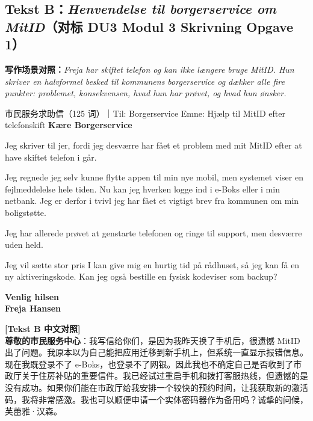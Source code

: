 \subsection*{Tekst B：\textit{Henvendelse til borgerservice om MitID}（对标 DU3 Modul 3 Skrivning Opgave 1）}

\textbf{写作场景对照：}\textit{Freja har skiftet telefon og kan ikke længere bruge MitID. Hun skriver en halvformel besked til kommunens borgerservice og dækker alle fire punkter: problemet, konsekvensen, hvad hun har prøvet, og hvad hun ønsker.}

\vspace{0.3em}
\begin{emailbox}{市民服务求助信（125 词）｜Til: Borgerservice \quad Emne: Hjælp til MitID efter telefonskift}
\textbf{Kære Borgerservice}

Jeg skriver til jer, fordi jeg desværre har fået et problem med mit MitID efter at have skiftet telefon i går.

Jeg regnede  jeg selv kunne flytte appen til min nye mobil, men systemet viser en fejlmeddelelse hele tiden. Nu kan jeg hverken logge ind i e-Boks eller i min netbank. Jeg er derfor i tvivl  jeg har fået et vigtigt brev fra kommunen om min boligstøtte.

Jeg har allerede prøvet at genstarte telefonen og ringe til support, men desværre uden held.

Jeg vil sætte stor pris  I kan give mig en hurtig tid på rådhuset, så jeg kan få en ny aktiveringskode. Kan jeg også bestille en fysisk kodeviser som backup?

\textbf{Venlig hilsen}\\
\textbf{Freja Hansen}
\end{emailbox}

\begin{transbox}
\small
\textbf{\color{NCDTeal}[Tekst B 中文对照]}\\
\textbf{尊敬的市民服务中心}：我写信给你们，是因为我昨天换了手机后，很遗憾 MitID 出了问题。我原本以为自己能把应用迁移到新手机上，但系统一直显示报错信息。现在我既登录不了 e-Boks，也登录不了网银。因此我也不确定自己是否收到了市政厅关于住房补贴的重要信件。我已经试过重启手机和拨打客服热线，但遗憾的是没有成功。如果你们能在市政厅给我安排一个较快的预约时间，让我获取新的激活码，我将非常感激。我也可以顺便申请一个实体密码器作为备用吗？诚挚的问候，芙蕾雅·汉森。
\end{transbox}

